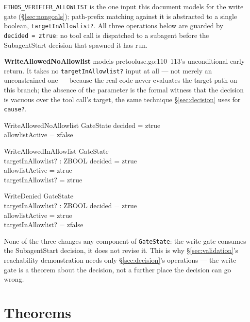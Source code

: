 \documentclass[a4paper,10pt,fleqn]{article}
\newcommand{\field}[1]{\texttt{#1}}
\begin{document}
\field{ETHOS\_VERIFIER\_ALLOWLIST} is the one input this document
models for the write gate (\S\ref{sec:nongoals}); path-prefix
matching against it is abstracted to a single boolean,
\field{targetInAllowlist?}. All three operations below are guarded
by \field{decided = ztrue}: no tool call is dispatched to a subagent
before the SubagentStart decision that spawned it has run.

\textbf{WriteAllowedNoAllowlist} models pretooluse.go:110--113's
unconditional early return. It takes no \field{targetInAllowlist?}
input at all --- not merely an unconstrained one --- because the
real code never evaluates the target path on this branch; the
absence of the parameter is the formal witness that the decision is
vacuous over the tool call's target, the same technique
\S\ref{sec:decision} uses for \field{cause?}.

\begin{schema}{WriteAllowedNoAllowlist}
\Xi GateState
\where
decided = ztrue \\
allowlistActive = zfalse
\end{schema}

\begin{schema}{WriteAllowedInAllowlist}
\Xi GateState \\
targetInAllowlist? : ZBOOL
\where
decided = ztrue \\
allowlistActive = ztrue \\
targetInAllowlist? = ztrue
\end{schema}

\begin{schema}{WriteDenied}
\Xi GateState \\
targetInAllowlist? : ZBOOL
\where
decided = ztrue \\
allowlistActive = ztrue \\
targetInAllowlist? = zfalse
\end{schema}

None of the three changes any component of \field{GateState}: the
write gate consumes the SubagentStart decision, it does not revise
it. This is why \S\ref{sec:validation}'s reachability demonstration
needs only \S\ref{sec:decision}'s operations --- the write gate is a
theorem about the decision, not a further place the decision can go
wrong.

\section{Theorems}
\label{sec:theorems}
\end{document}

